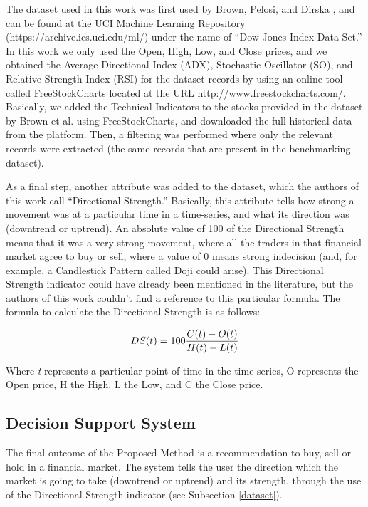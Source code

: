 \documentclass[12pt,journal,draftcls,onecolumn]{IEEEtran}
\begin{document}
The dataset used in this work was first used by Brown, Pelosi, and Dirska \cite{brown2013dynamic}, and can be found at the UCI Machine Learning Repository (https://archive.ics.uci.edu/ml/) under the name of ``Dow Jones Index Data Set.'' In this work we only used the Open, High, Low, and Close prices, and we obtained the Average Directional Index (ADX), Stochastic Oscillator (SO), and Relative Strength Index (RSI) for the dataset records by using an online tool called FreeStockCharts located at the URL http://www.freestockcharts.com/. Basically, we added the Technical Indicators to the stocks provided in the dataset by Brown et al. using FreeStockCharts, and downloaded the full historical data from the platform. Then, a filtering was performed where only the relevant records were extracted (the same records that are present in the benchmarking dataset).

As a final step, another attribute was added to the dataset, which the authors of this work call ``Directional Strength.'' Basically, this attribute tells how strong a movement was at a particular time in a time-series, and what its direction was (downtrend or uptrend). An absolute value of 100 of the Directional Strength means that it was a very strong movement, where all the traders in that financial market agree to buy or sell, where a value of 0 means strong indecision (and, for example, a Candlestick Pattern called Doji could arise). This Directional Strength indicator could have already been mentioned in the literature, but the authors of this work couldn't find a reference to this particular formula. The formula to calculate the Directional Strength is as follows:

\begin{equation} \label{directional-strength}
  DS(t) = 100{{C(t) - O(t)} \over {H(t) - L(t)}}
\end{equation}

Where \textit{t} represents a particular point of time in the time-series, O represents the Open price, H the High, L the Low, and C the Close price.

\subsection{Decision Support System}

The final outcome of the Proposed Method is a recommendation to buy, sell or hold in a financial market. The system tells the user the direction which the market is going to take (downtrend or uptrend) and its strength, through the use of the Directional Strength indicator (see Subsection \ref{dataset}).
\end{document}

